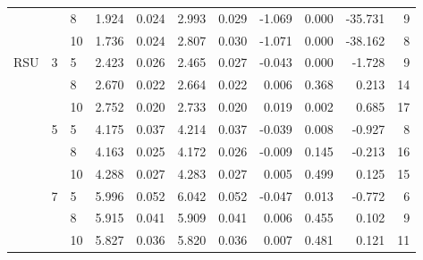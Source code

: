 \begin{tabular}{lllrrrrrrrr}
    &   & 8  &  1.924 &     0.024 &  2.993 &     0.029 &     -1.069 &   0.000 &   -35.731 &   9 \\
    &   & 10 &  1.736 &     0.024 &  2.807 &     0.030 &     -1.071 &   0.000 &   -38.162 &   8 \\
RSU & 3 & 5  &  2.423 &     0.026 &  2.465 &     0.027 &     -0.043 &   0.000 &    -1.728 &   9 \\
    &   & 8  &  2.670 &     0.022 &  2.664 &     0.022 &      0.006 &   0.368 &     0.213 &  14 \\
    &   & 10 &  2.752 &     0.020 &  2.733 &     0.020 &      0.019 &   0.002 &     0.685 &  17 \\
    & 5 & 5  &  4.175 &     0.037 &  4.214 &     0.037 &     -0.039 &   0.008 &    -0.927 &   8 \\
    &   & 8  &  4.163 &     0.025 &  4.172 &     0.026 &     -0.009 &   0.145 &    -0.213 &  16 \\
    &   & 10 &  4.288 &     0.027 &  4.283 &     0.027 &      0.005 &   0.499 &     0.125 &  15 \\
    & 7 & 5  &  5.996 &     0.052 &  6.042 &     0.052 &     -0.047 &   0.013 &    -0.772 &   6 \\
    &   & 8  &  5.915 &     0.041 &  5.909 &     0.041 &      0.006 &   0.455 &     0.102 &   9 \\
    &   & 10 &  5.827 &     0.036 &  5.820 &     0.036 &      0.007 &   0.481 &     0.121 &  11 \\
\bottomrule
\end{tabular}
